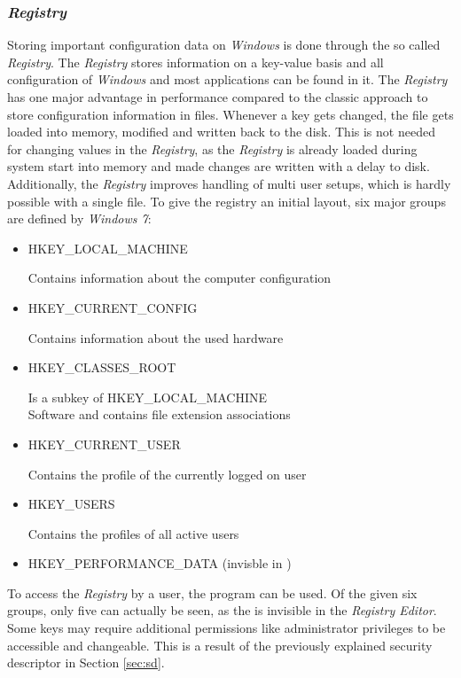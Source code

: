 \subsubsection{\emph{Registry}}
Storing important configuration data on \emph{Windows} is done through the so called \emph{Registry}. The \emph{Registry} stores information on a key-value basis and all configuration of \emph{Windows} and most applications can be found in it. The \emph{Registry} has one major advantage in performance compared to the classic approach to store configuration information in  files. Whenever a key gets changed, the  file gets loaded into memory, modified and written back to the disk. This is not needed for changing values in the \emph{Registry}, as the \emph{Registry} is already loaded during system start into memory and made changes are written with a delay to disk. Additionally, the \emph{Registry} improves handling of multi user setups, which is hardly possible with a single  file. To give the registry an initial layout, six major groups are defined by \emph{Windows 7}:
\begin{itemize}
\label{sec:registrykeys}
\item HKEY\_LOCAL\_MACHINE

Contains information about the computer configuration
\item HKEY\_CURRENT\_CONFIG

Contains information about the used hardware
\item HKEY\_CLASSES\_ROOT

Is a subkey of HKEY\_LOCAL\_MACHINE\\Software and contains file extension associations
\item HKEY\_CURRENT\_USER 

Contains the profile of the currently logged on user
\item HKEY\_USERS

Contains the profiles of all active users
\item HKEY\_PERFORMANCE\_DATA (invisble in )
\end{itemize}
To access the \emph{Registry} by a user, the  \cite{msdn_regedit} program can be used. Of the given six groups, only five can actually be seen, as the  is invisible in the \emph{Registry Editor}. Some keys may require additional permissions like administrator privileges to be accessible and changeable. This is a result of the previously explained security descriptor in Section \ref{sec:sd}.